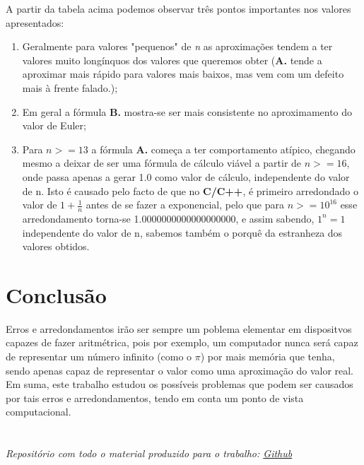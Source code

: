 \documentclass[12pt, letterpaper]{article}
\begin{document}
A partir da tabela acima podemos observar três pontos importantes nos valores apresentados:

\begin{enumerate}
    \item Geralmente para valores "pequenos" de \textit{n} as aproximações tendem a ter valores muito longínquos dos valores que queremos obter (\textbf{A.} tende a aproximar mais rápido para valores mais baixos, mas vem com um defeito mais à frente falado.);
    \item Em geral a fórmula \textbf{B.} mostra-se ser mais consistente no aproximamento do valor de Euler;
    \item Para $n >= 13$ a fórmula \textbf{A.} começa a ter comportamento atípico, chegando mesmo a deixar de ser uma fórmula de cálculo viável a partir de $n >= 16$, onde passa apenas a gerar 1.0 como valor de cálculo, independente do valor de n. Isto é causado pelo facto de que no \textbf{C/C++}, é primeiro arredondado o valor de $1+\frac{1}{n}$ antes de se fazer a exponencial, pelo que para $n >= 10^{16}$ esse arredondamento torna-se 1.0000000000000000000, e assim sabendo, $1^n = 1$ independente do valor de n, sabemos também o porquê da estranheza dos valores obtidos.
\end{enumerate}

\section*{Conclusão}
Erros e arredondamentos irão ser sempre um poblema elementar em dispositvos capazes de fazer aritmétrica, pois por exemplo, um computador nunca será capaz de representar um número infinito (como o $\pi$) por mais memória que tenha, sendo apenas capaz de representar o valor como uma aproximação do valor real.
Em suma, este trabalho estudou os possíveis problemas que podem ser causados por tais erros e arredondamentos, tendo em conta um ponto de vista computacional.

\section*{}
\textit{Repositório com todo o material produzido para o trabalho: \href{https://github.com/Hasuru/AN_tp1}{Github}}
\end{document}
